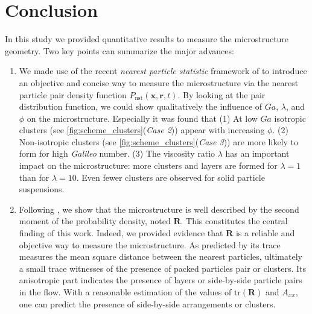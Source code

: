 \section{Conclusion}
\label{sec:conclusion_mic}
In this study we provided quantitative results to measure the microstructure geometry.
Two key points can summarize the major advances:
\begin{enumerate}
    \item We made use of the recent \textit{nearest particle statistic} framework of \citet{zhang2023evolution} to introduce an objective and concise way to measure the microstructure via the nearest particle pair density function $P_\text{nst}(\textbf{x},\textbf{r},t)$. 
    By looking at the pair distribution function, we could show qualitatively the influence of $Ga$, $\lambda$, and $\phi$ on the microstructure.
    Especially it was found that 
    (1) At low $Ga$ isotropic clusters (see \ref{fig:scheme_clusters}(\textit{Case 2})) appear with increasing $\phi$. 
    (2) Non-isotropic clusters (see \ref{fig:scheme_clusters}(\textit{Case 3})) are more likely to form for high \textit{Galileo} number.
    (3) The viscosity ratio $\lambda$ has an important impact on the microstructure: more clusters and layers are formed for $\lambda = 1$ than for $\lambda = 10$. 
    Even fewer clusters are observed for solid particle suspensions. 
    \item Following \citet{zhang2023evolution}, we show that the microstructure is well described by the second moment of the probability density, noted $\textbf{R}$. 
    This constitutes the central finding of this work. Indeed, we provided evidence that $\textbf{R}$ is a reliable and objective way to measure the microstructure.
    As predicted by \citet{zhang2023evolution} its trace measures the mean square distance between the nearest particles, ultimately a small trace witnesses of the presence of packed particles pair or clusters.
    Its anisotropic part indicates the presence of layers or side-by-side particle pairs in the flow. 
    With a reasonable estimation of the values of $\text{tr}(\textbf{R})$ and $A_{xx}$, one can predict the presence of side-by-side arrangements or clusters.
\end{enumerate}

